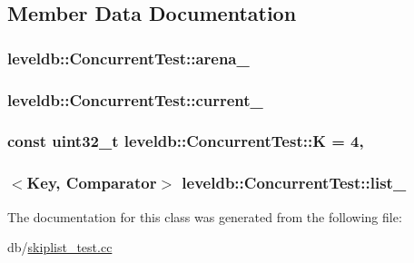 \subsection{Member Data Documentation}
\hypertarget{classleveldb_1_1_concurrent_test_ae067606a3961c13de52700428dcbfd5c}{
\subsubsection[{arena\-\_\-}]{ leveldb\-::\-Concurrent\-Test\-::arena\-\_\-\hspace{0.3cm}{\ttfamily [private]}}}\label{classleveldb_1_1_concurrent_test_ae067606a3961c13de52700428dcbfd5c}
\hypertarget{classleveldb_1_1_concurrent_test_a11c5013d5af02237e637b6013efbdf8b}{
\subsubsection[{current\-\_\-}]{ leveldb\-::\-Concurrent\-Test\-::current\-\_\-\hspace{0.3cm}{\ttfamily [private]}}}\label{classleveldb_1_1_concurrent_test_a11c5013d5af02237e637b6013efbdf8b}
\hypertarget{classleveldb_1_1_concurrent_test_a7ec0efa701eb4bc34cff1f7a9c6ba6bd}{
\subsubsection[{K}]{\setlength{\rightskip}{0pt plus 5cm}const {\bf uint32\-\_\-t} leveldb\-::\-Concurrent\-Test\-::\-K = 4\hspace{0.3cm}{\ttfamily [static]}, {\ttfamily [private]}}}\label{classleveldb_1_1_concurrent_test_a7ec0efa701eb4bc34cff1f7a9c6ba6bd}
\hypertarget{classleveldb_1_1_concurrent_test_a464336022164fd66379851cec882f237}{
\subsubsection[{list\-\_\-}]{$<${\bf Key}, {\bf Comparator}$>$ leveldb\-::\-Concurrent\-Test\-::list\-\_\-\hspace{0.3cm}{\ttfamily [private]}}}\label{classleveldb_1_1_concurrent_test_a464336022164fd66379851cec882f237}


The documentation for this class was generated from the following file\-:\begin{DoxyCompactItemize}
\item 
db/\hyperlink{skiplist__test_8cc}{skiplist\-\_\-test.\-cc}\end{DoxyCompactItemize}
